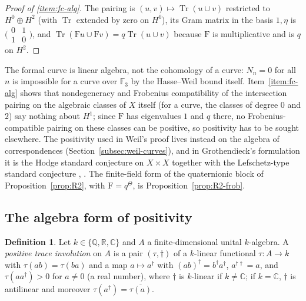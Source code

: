 \documentclass[11pt]{amsart}
\theoremstyle{plain}
\theoremstyle{definition}
\newtheorem{definition}[theorem]{Definition}
\theoremstyle{remark}
\numberwithin{equation}{section}
\newcommand{\C}{\mathbb{C}}
\newcommand{\R}{\mathbb{R}}
\newcommand{\Q}{\mathbb{Q}}
\newcommand{\F}{\mathbb{F}}
\DeclareMathOperator{\Tr}{Tr}
\begin{document}
\begin{proof}[Proof of \ref{item:fc-alg}]
The pairing is $(u,v)\mapsto\Tr(u\cup v)$ restricted to $H^0\oplus H^2$
(with $\Tr$ extended by zero on $H^0$), its Gram matrix in the basis
$1,\eta$ is $\bigl(\begin{smallmatrix}0&1\\1&0\end{smallmatrix}\bigr)$,
and $\Tr(\mathrm{F}u\cup\mathrm{F}v)=q\Tr(u\cup v)$ because
$\mathrm{F}$ is multiplicative and is $q$ on $H^2$.
\end{proof}


The formal curve is linear algebra, not the cohomology of a curve:
$N_n=0$ for all $n$ is impossible for a curve over $\F_3$ by the
Hasse--Weil bound itself. Item~\ref{item:fc-alg} shows that
nondegeneracy and Frobenius compatibility of the intersection pairing on
the algebraic classes of $X$ itself (for a curve, the classes of degree
$0$ and $2$) say nothing about $H^1$; since $\mathrm{F}$ has eigenvalues
$1$ and $q$ there, no Frobenius-compatible pairing on these classes can
be positive, so positivity has to be sought elsewhere. The positivity used in
Weil's proof
lives instead on the algebra of correspondences
(Section~\ref{subsec:weil-curves}), and in Grothendieck's formulation it
is the Hodge standard conjecture on $X\times X$ together with the
Lefschetz-type standard conjecture
\cite[Introduction, pp.~359--360]{Kleiman1968Cycles},
\cite[Definition~3.6, p.~39, and Theorems~3.15 and~3.17, p.~42]%
{Milne2016RHFF}. The finite-field form of the quaternionic block of
Proposition~\ref{prop:R2}, with $\mathrm{F}=q^\Theta$, is
Proposition~\ref{prop:R2-frob}.

\subsection{The algebra form of positivity}\label{subsec:algebra-form}

\begin{definition}\label{def:pos-involution}
Let $k\in\{\Q,\R,\C\}$ and $A$ a finite-dimensional unital
$k$-algebra. A \emph{positive trace involution} on $A$ is a pair
$(\tau,\dagger)$ of a $k$-linear functional $\tau:A\to k$ with
$\tau(ab)=\tau(ba)$ and a map $a\mapsto a^\dagger$ with
$(ab)^\dagger=b^\dagger a^\dagger$, $a^{\dagger\dagger}=a$, and
$\tau(aa^\dagger)>0$ for $a\ne0$ (a real number), where $\dagger$ is
$k$-linear if $k\ne\C$; if $k=\C$, $\dagger$ is antilinear and
moreover $\tau(a^\dagger)=\overline{\tau(a)}$.
\end{definition}
\end{document}

